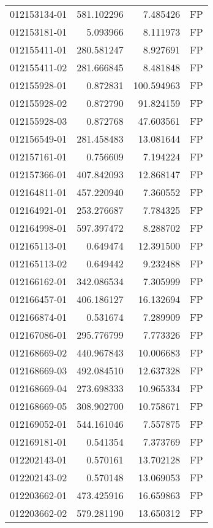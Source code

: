 \begin{tabular}{lrrl}
012153134-01 &  581.102296 &     7.485426 &   FP \\
012153181-01 &    5.093966 &     8.111973 &   FP \\
012155411-01 &  280.581247 &     8.927691 &   FP \\
012155411-02 &  281.666845 &     8.481848 &   FP \\
012155928-01 &    0.872831 &   100.594963 &   FP \\
012155928-02 &    0.872790 &    91.824159 &   FP \\
012155928-03 &    0.872768 &    47.603561 &   FP \\
012156549-01 &  281.458483 &    13.081644 &   FP \\
012157161-01 &    0.756609 &     7.194224 &   FP \\
012157366-01 &  407.842093 &    12.868147 &   FP \\
012164811-01 &  457.220940 &     7.360552 &   FP \\
012164921-01 &  253.276687 &     7.784325 &   FP \\
012164998-01 &  597.397472 &     8.288702 &   FP \\
012165113-01 &    0.649474 &    12.391500 &   FP \\
012165113-02 &    0.649442 &     9.232488 &   FP \\
012166162-01 &  342.086534 &     7.305999 &   FP \\
012166457-01 &  406.186127 &    16.132694 &   FP \\
012166874-01 &    0.531674 &     7.289909 &   FP \\
012167086-01 &  295.776799 &     7.773326 &   FP \\
012168669-02 &  440.967843 &    10.006683 &   FP \\
012168669-03 &  492.084510 &    12.637328 &   FP \\
012168669-04 &  273.698333 &    10.965334 &   FP \\
012168669-05 &  308.902700 &    10.758671 &   FP \\
012169052-01 &  544.161046 &     7.557875 &   FP \\
012169181-01 &    0.541354 &     7.373769 &   FP \\
012202143-01 &    0.570161 &    13.702128 &   FP \\
012202143-02 &    0.570148 &    13.069053 &   FP \\
012203662-01 &  473.425916 &    16.659863 &   FP \\
012203662-02 &  579.281190 &    13.650312 &   FP \\

\end{tabular}
